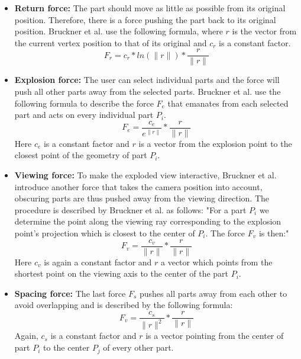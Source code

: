 \begin{itemize}
	\item \textbf{Return force:} The part should move as little as possible from its original position. Therefore, there is a force pushing the part back to its original position. Bruckner et al. use the following formula, where $r$ is the vector from the current vertex position to that of its original and $c_r$ is a constant factor. 
	\begin{equation}
		F_r = c_r * ln(\|r\|) * \frac{r}{\|r\|}
		\label{eq:returnforce}
	\end{equation}
	
	\item \textbf{Explosion force:} The user can select individual parts and the force will push all other parts away from the selected parts. Bruckner et al. use the following formula to describe the force $F_e$ that emanates from each selected part and acts on every individual part $P_i$.
	\begin{equation}
		F_e = \frac{c_e}{e^{\|r\|}} * \frac{r}{\|r\|}
		\label{eq:explosionforce}
	\end{equation}
	Here $c_e$ is a constant factor and $r$ is a vector from the explosion point to the closest point of the geometry of part $P_i$.

	\item \textbf{Viewing force:} To make the exploded view interactive, Bruckner et al. introduce another force that takes the camera position into account, obscuring parts are thus pushed away from the viewing direction. The procedure is described by Bruckner et al. as follows: 
	"For a part $P_i$ we determine the point along the viewing ray corresponding to the explosion point’s projection which is closest to
	the center of $P_i$. The force $F_v$ is then:"
	\begin{equation}
		F_v = \frac{c_v}{\|r\|} * \frac{r}{\|r\|}
		\label{eq:viewingforce}
	\end{equation}
	Here $c_v$ is again a constant factor and $r$ a vector which points from the shortest point on the viewing axis to the center of the part $P_i$.  

	\item \textbf{Spacing force:} The last force $F_s$ pushes all parts away from each other to avoid overlapping and is described by the following formula:
	\begin{equation}
		F_v = \frac{c_s}{\|r\|^2} * \frac{r}{\|r\|}
		\label{eq:spacingforce}
	\end{equation}
	Again, $c_s$ is a constant factor and $r$ is a vector pointing from the center of part $P_i$ to the center $P_j$ of every other part.
\end{itemize}

